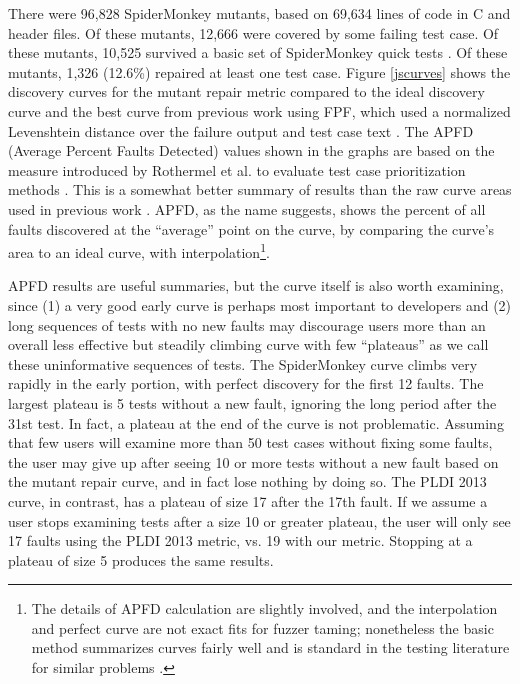 There were 96,828 SpiderMonkey mutants, based on 69,634 lines of code in C and header files.  Of these mutants, 12,666 were covered by some failing test case.  Of these mutants, 10,525 survived a basic set of SpiderMonkey quick tests \cite{icst2014}.  Of these mutants, 1,326 (12.6\%) repaired at least one test case.  Figure \ref{jscurves} shows the discovery curves for the mutant repair metric compared to the ideal discovery curve and the best curve from previous work using FPF, which used a normalized Levenshtein distance \cite{lev} over the failure output and test case text \cite{PLDI13}.  The APFD (Average Percent Faults Detected) values shown in the graphs are based on the measure  introduced by Rothermel et al. to evaluate test case prioritization methods \cite{APFD}.  This is a somewhat better summary of results than the raw curve areas used in previous work \cite{PLDI13}.  APFD, as the name suggests, shows the percent of all faults discovered at the ``average'' point on the curve, by comparing the curve's area to an ideal curve, with interpolation\footnote{The details of APFD calculation are slightly involved, and the interpolation and perfect curve are not exact fits for fuzzer taming; nonetheless the basic method summarizes curves fairly well and is standard in the testing literature for similar problems \cite{issta14}.}. 

APFD results are useful summaries, but the curve itself is also worth examining, since (1) a very good early curve is perhaps most important to developers and (2) long sequences of tests with no new faults may discourage users more than an overall less effective but steadily climbing curve with few ``plateaus'' as we call these uninformative sequences of tests.  The SpiderMonkey curve climbs very rapidly in the early portion, with perfect discovery for the first 12 faults. The largest plateau is 5 tests without a new fault, ignoring the long period after the 31st test.  In fact, a plateau at the end of the curve is not problematic.  Assuming that few users will examine more than 50 test cases without fixing some faults, the user may give up after seeing 10 or more tests without a new fault based on the mutant repair curve, and in fact lose nothing by doing so.  The PLDI 2013 curve, in contrast, has a plateau of size 17 after the 17th fault.  If we assume a user stops examining tests after a size 10 or greater plateau, the user will only see 17 faults using the PLDI 2013 metric, vs. 19 with our metric.  Stopping at a plateau of size 5 produces the same results.

